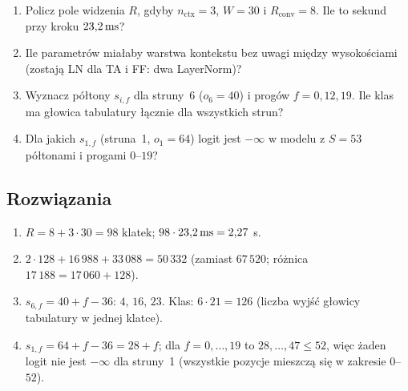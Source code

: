 \begin{sprawdz}
\begin{enumerate}
\item Policz pole widzenia $R$, gdyby $n_\mathrm{ctx}=3$, $W=30$ i $R_\mathrm{conv}=8$. Ile to sekund przy kroku $23{,}2\,\mathrm{ms}$?
\item Ile parametrów miałaby warstwa kontekstu bez uwagi między wysokościami (zostają LN dla TA i FF: dwa LayerNorm)?
\item Wyznacz półtony $s_{i,f}$ dla struny~6 ($o_6=40$) i progów $f=0,12,19$. Ile klas ma głowica tabulatury łącznie dla wszystkich strun?
\item Dla jakich $s_{1,f}$ (struna~1, $o_1=64$) logit jest $-\infty$ w modelu z $S=53$ półtonami i progami $0$--$19$?
\end{enumerate}
\end{sprawdz}

\subsection*{Rozwiązania}
\begin{enumerate}
\item $R=8+3\cdot30=98$ klatek; $98\cdot23{,}2\,\mathrm{ms}=2{,}27$ s.
\item $2\cdot128+16\,988+33\,088=50\,332$ (zamiast $67\,520$; różnica $17\,188=17\,060+128$).
\item $s_{6,f}=40+f-36$: $4,\,16,\,23$. Klas: $6\cdot21=126$ (liczba wyjść głowicy tabulatury w jednej klatce).
\item $s_{1,f}=64+f-36=28+f$; dla $f=0,\dots,19$ to $28,\dots,47\le52$, więc żaden logit nie jest $-\infty$ dla struny~1 (wszystkie pozycje mieszczą się w zakresie $0$--$52$).
\end{enumerate}
